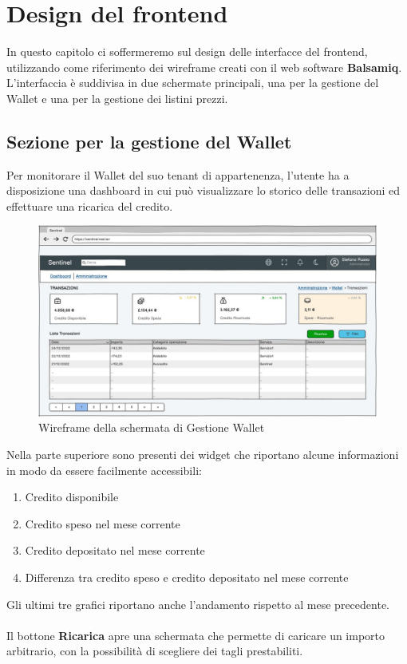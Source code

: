 \chapter{Design del frontend}
In questo capitolo ci soffermeremo sul design delle interfacce del frontend, utilizzando come riferimento dei wireframe creati con il web software \textbf{Balsamiq}.
L'interfaccia \`e suddivisa in due schermate principali, una per la gestione del Wallet e una per la gestione dei listini prezzi.

\section{Sezione per la gestione del Wallet}
Per monitorare il Wallet del suo tenant di appartenenza, l'utente ha a disposizione una dashboard in cui pu\`o visualizzare lo storico delle transazioni ed effettuare una ricarica del credito.

\begin{figure}[H]
  \centering
  \includegraphics[width=13cm]{images/gestione-wallet/mock-gestione-wallet.png}
  \caption{Wireframe della schermata di Gestione Wallet}
\end{figure}

Nella parte superiore sono presenti dei widget che riportano alcune informazioni in modo da essere facilmente accessibili:
\begin{enumerate}
  \item Credito disponibile
  \item Credito speso  nel mese corrente
  \item Credito depositato nel mese corrente
  \item Differenza tra credito speso e credito depositato nel mese corrente
\end{enumerate}
Gli ultimi tre grafici riportano anche l'andamento rispetto al mese precedente.
\\\\
Il bottone \textbf{Ricarica} apre una schermata che permette di caricare un importo arbitrario, con la possibilit\`a di scegliere
dei tagli prestabiliti.

